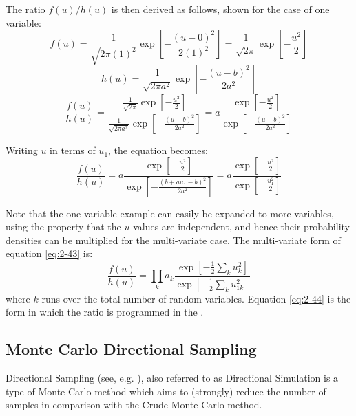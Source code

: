 The ratio $f(u)/h(u)$ is then derived as follows, shown for the case of one variable:
\begin{equation}
f\left(u\right)=\frac{1}{\sqrt{2\pi \left(1\right)^{2} } } \exp \left[-\frac{\left(u-0\right)^{2} }{2\left(1\right)^{2} } \right]=\frac{1}{\sqrt{2\pi } } \exp \left[-\frac{u^{2} }{2} \right] \label{eq:2-39} 
\end{equation}
\begin{equation}
h\left(u\right)=\frac{1}{\sqrt{2\pi a ^{2} } } \exp \left[-\frac{\left(u-b \right)^{2} }{2a ^{2} } \right]  \label{eq:2-40} 
\end{equation}
\begin{equation}
\frac{f\left(u\right)}{h\left(u\right)} =\frac{\frac{1}{\sqrt{2\pi } } \exp \left[-\frac{u^{2} }{2} \right]}{\frac{1}{\sqrt{2\pi a^{2} } } \exp \left[-\frac{(u-b)^{2} }{2a^{2} } \right]} =a\frac{\exp \left[-\frac{u^{2} }{2} \right]}{\exp \left[-\frac{(u-b)^{2} }{2a^{2} } \right]}  \label{eq:2-41} 
\end{equation}

Writing $u$ in terms of $u_1$, the equation becomes:
\begin{equation}
\frac{f\left(u\right)}{h\left(u\right)} =a\frac{\exp \left[-\frac{u^{2} }{2} \right]}{\exp \left[-\frac{\left(b+au_{1}-b \right)^{2} }{2a^{2} } \right]} =a\frac{\exp \left[-\frac{u^{2} }{2} \right]}{\exp \left[-\frac{u_{1} ^{2} }{2} \right]} \label{eq:2-43} 
\end{equation}

Note that the one-variable example can easily be expanded to more variables, using the property that the $u$-values are independent, and hence their probability densities can be multiplied for the multi-variate case. The multi-variate form of equation \eqref{eq:2-43} is:
\begin{equation}
\frac{f\left(u\right)}{h\left(u\right)} =\prod_{k} a_{k} \frac{\exp \left[-\frac{1}{2} \sum _{k}u_{k} ^{2}  \right]}{\exp \left[-\frac{1}{2} \sum _{k}u_{1k} ^{2}  \right]}  \label{eq:2-44} 
\end{equation}
where $k$ runs over the total number of random variables. Equation \eqref{eq:2-44} is the form in which the ratio is programmed in the \probLib.

\subsection{Monte Carlo Directional Sampling\label{sec:directionalsampling}}
Directional Sampling (see, e.g. \cite{Bjerager1988}), also referred to as Directional Simulation is a type of Monte Carlo method which aims to (strongly) reduce the number of samples in comparison with the Crude Monte Carlo method.

